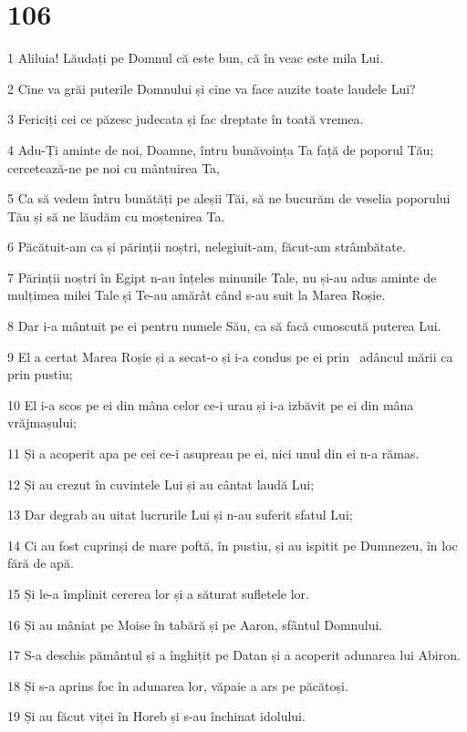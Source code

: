 \chapter{106}

\par 1 Aliluia! Lăudați pe Domnul că este bun, că în veac este mila Lui.
\par 2 Cine va grăi puterile Domnului și cine va face auzite toate laudele Lui?
\par 3 Fericiți cei ce păzesc judecata și fac dreptate în toată vremea.
\par 4 Adu-Ți aminte de noi, Doamne, întru bunăvoința Ta față de poporul Tău; cercetează-ne pe noi cu mântuirea Ta,
\par 5 Ca să vedem întru bunătăți pe aleșii Tăi, să ne bucurăm de veselia poporului Tău și să ne lăudăm cu moștenirea Ta.
\par 6 Păcătuit-am ca și părinții noștri, nelegiuit-am, făcut-am strâmbătate.
\par 7 Părinții noștri în Egipt n-au înțeles minunile Tale, nu și-au adus aminte de mulțimea milei Tale și Te-au amărât când s-au suit la Marea Roșie.
\par 8 Dar i-a mântuit pe ei pentru numele Său, ca să facă cunoscută puterea Lui.
\par 9 El a certat Marea Roșie și a secat-o și i-a condus pe ei prin  adâncul mării ca prin pustiu;
\par 10 El i-a scos pe ei din mâna celor ce-i urau și i-a izbăvit pe ei din mâna vrăjmașului;
\par 11 Și a acoperit apa pe cei ce-i asupreau pe ei, nici unul din ei n-a rămas.
\par 12 Și au crezut în cuvintele Lui și au cântat laudă Lui;
\par 13 Dar degrab au uitat lucrurile Lui și n-au suferit sfatul Lui;
\par 14 Ci au fost cuprinși de mare poftă, în pustiu, și au ispitit pe Dumnezeu, în loc fără de apă.
\par 15 Și le-a împlinit cererea lor și a săturat sufletele lor.
\par 16 Și au mâniat pe Moise în tabără și pe Aaron, sfântul Domnului.
\par 17 S-a deschis pământul și a înghițit pe Datan și a acoperit adunarea lui Abiron.
\par 18 Și s-a aprins foc în adunarea lor, văpaie a ars pe păcătoși.
\par 19 Și au făcut viței în Horeb și s-au închinat idolului.
